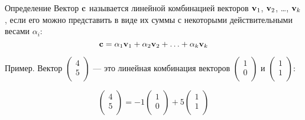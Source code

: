 \begin{frame}

\begin{block}{Определение} 
Вектор $\mathbf{c}$ называется \alert{линейной комбинацией} векторов $\mathbf{v}_1$, $\mathbf{v}_2$, \ldots, $\mathbf{v}_k$, 
если его можно представить в виде их суммы с некоторыми действительными весами $\alpha_i$:
\[
  \mathbf{c} = \alpha_1 \mathbf{v}_1 + \alpha_2 \mathbf{v}_2 + \ldots + \alpha_k \mathbf{v}_k
\]
\end{block}

\pause
Пример. Вектор $\begin{pmatrix}
  4 \\
  5 \\
\end{pmatrix}$ — это линейная комбинация векторов $\begin{pmatrix}
  1 \\
  0 \\
\end{pmatrix}$ и $\begin{pmatrix}
  1 \\
  1 \\
\end{pmatrix}$:

\[
\begin{pmatrix}
  4 \\
  5 \\
\end{pmatrix} = -1 \begin{pmatrix}
  1 \\
  0 \\
\end{pmatrix} + 5 \begin{pmatrix}
  1 \\
  1 \\
\end{pmatrix}  
\]


\end{frame}




